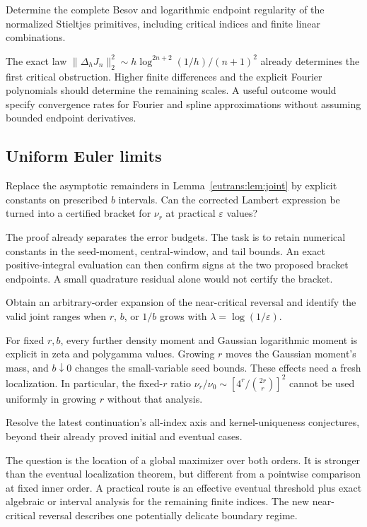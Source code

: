 \begin{question}
Determine the complete Besov and logarithmic endpoint regularity of
the normalized Stieltjes primitives, including critical indices and
finite linear combinations.
\end{question}
The exact law $\|\Delta_hJ_n\|_2^2\sim
h\log^{2n+2}(1/h)/(n+1)^2$ already determines the first critical
obstruction. Higher finite differences and the explicit Fourier
polynomials should determine the remaining scales. A useful outcome
would specify convergence rates for Fourier and spline approximations
without assuming bounded endpoint derivatives.

\subsection{Uniform Euler limits}

\begin{question}
Replace the asymptotic remainders in
Lemma~\ref{eutrans:lem:joint} by explicit constants on prescribed
$b$ intervals. Can the corrected Lambert expression be turned into
a certified bracket for $\nu_r$ at practical $\varepsilon$ values?
\end{question}
The proof already separates the error budgets. The task is to retain
numerical constants in the seed-moment, central-window, and tail bounds.
An exact positive-integral evaluation can then confirm signs at the
two proposed bracket endpoints. A small quadrature residual alone
would not certify the bracket.

\begin{question}
Obtain an arbitrary-order expansion of the near-critical reversal
and identify the valid joint ranges when $r$, $b$, or $1/b$ grows
with $\lambda=\log(1/\varepsilon)$.
\end{question}
For fixed $r,b$, every further density moment and Gaussian logarithmic
moment is explicit in zeta and polygamma values. Growing $r$ moves the
Gaussian moment's mass, and $b\downarrow0$ changes the small-variable
seed bounds. These effects need a fresh localization. In particular,
the fixed-$r$ ratio $\nu_r/\nu_0\sim
[4^r/\binom{2r}{r}]^2$ cannot be used uniformly in growing $r$
without that analysis.

\begin{question}
Resolve the latest continuation's all-index axis and kernel-uniqueness
conjectures, beyond their already proved initial and eventual cases.
\end{question}
The question is the location of a global maximizer over both orders.
It is stronger than the eventual localization theorem, but different
from a pointwise comparison at fixed inner order. A practical route is
an effective eventual threshold plus exact algebraic or interval
analysis for the remaining finite indices. The new near-critical
reversal describes one potentially delicate boundary regime.

